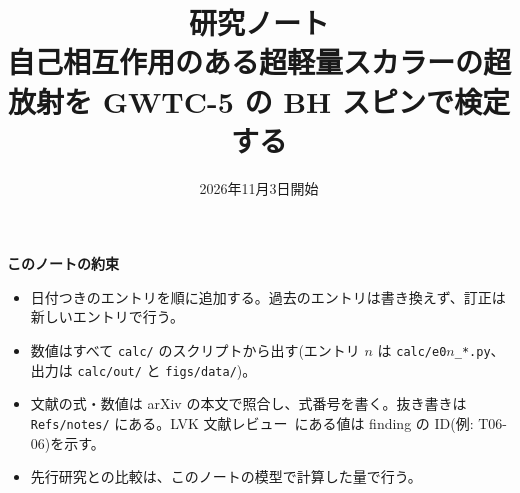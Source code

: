 \documentclass[a4paper,10pt]{ltjsarticle}
\title{研究ノート\\自己相互作用のある超軽量スカラーの超放射を GWTC-5 の BH スピンで検定する}
\author{}
\date{2026年11月3日開始}
\newcommand{\review}{LVK 文献レビュー}  %
\numberwithin{equation}{section}
\begin{document}
\maketitle
\vspace{-2.5em}

\begin{tcolorbox}[colback=white, colframe=ink2, boxrule=0.4pt, arc=2pt, left=6pt, right=6pt]
\small
\textbf{このノートの約束}
\begin{itemize}
\item 日付つきのエントリを順に追加する。過去のエントリは書き換えず、訂正は新しいエントリで行う。
\item 数値はすべて \texttt{calc/} のスクリプトから出す(エントリ $n$ は \texttt{calc/e0$n$\_*.py}、出力は \texttt{calc/out/} と \texttt{figs/data/})。
\item 文献の式・数値は arXiv の本文で照合し、式番号を書く。抜き書きは \texttt{Refs/notes/} にある。\review\ にある値は finding の ID(例: T06-06)を示す。
\item 先行研究との比較は、このノートの模型で計算した量で行う。
\end{itemize}
\end{tcolorbox}

\tableofcontents
























\end{document}
